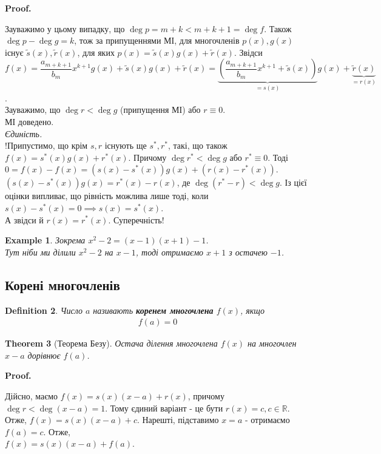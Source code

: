 \documentclass[a4paper, 10pt]{extarticle}
\makeatletter
\def\qed{$\blacksquare$}
\def\qed{$\blacksquare$}
\theoremstyle{theoremdd}
\newtheorem{theorem}{Theorem}[subsection]
\theoremstyle{theoremdd}
\newtheorem{definition}[theorem]{Definition}
\theoremstyle{theoremdd}
\theoremstyle{theoremdd}
\newtheorem{example}[theorem]{Example}
\theoremstyle{theoremdd}
\theoremstyle{theoremdd}
\theoremstyle{theoremdd}
\theoremstyle{theoremdd}
\renewenvironment{proof}[1][Proof.\\]{\par
\pushQED{\hfill \qed}%
\normalfont \topsep6\p@\@plus6\p@\relax
\trivlist
\item\relax
{\bfseries
#1\@addpunct{.}}\hspace\labelsep\ignorespaces
}{%
\popQED\endtrivlist\@endpefalse
}
\makeatother
\begin{document}
\begin{proof}
Зауважимо у цьому випадку, що $\deg p = m+k < m+k+1 = \deg f$. Також $\deg p - \deg g = k$, тож за припущеннями МІ, для многочленів $p(x),g(x)$ існує $\tilde{s}(x), \tilde{r}(x)$, для яких $p(x) = \tilde{s}(x) g(x) + \tilde{r}(x)$. Звідси\\
$f(x) = \dfrac{a_{m+k+1}}{b_m}x^{k+1}g(x) + \tilde{s}(x)g(x) + \tilde{r}(x) = \underbrace{\left(\dfrac{a_{m+k+1}}{b_m}x^{k+1} + \tilde{s}(x) \right)}_{=s(x)}g(x) + \underbrace{\tilde{r}(x)}_{=r(x)}$.\\
Зауважимо, що $\deg r < \deg g$ (припущення МІ) або $r \equiv 0$.\\
МІ доведено.
\bigskip \\
\textit{Єдиність.}\\
!Припустимо, що крім $s,r$ існують ще $s^*,r^*$, такі, що також $f(x) = s^*(x)g(x) + r^*(x)$. Причому $\deg r^* < \deg g$ або $r^* \equiv 0$. Тоді \\ $0 = f(x) - f(x) = (s(x)-s^*(x))g(x) + (r(x)-r^*(x))$.\\
$(s(x)-s^*(x))g(x) = r^*(x)-r(x)$, де $\deg(r^*-r) < \deg g$. Із цієї оцінки випливає, що рівність можлива лише тоді, коли $s(x)-s^*(x) =0 \implies s(x) = s^*(x)$.\\
А звідси й $r(x) = r^*(x)$. Суперечність!
\end{proof}

\begin{example}
Зокрема $x^2-2 = (x-1)(x+1) -1$.\\
Тут ніби ми ділили $x^2-2$ на $x-1$, тоді отримаємо $x+1$ з остачею $-1$.
\end{example}

\subsection{Корені многочленів}
\begin{definition}
Число $a$ називають \textbf{коренем многочлена} $f(x)$, якщо
\begin{align*}
f(a) = 0
\end{align*}
\end{definition}

\begin{theorem}[Теорема Безу]
Остача ділення многочлена $f(x)$ на многочлен $x-a$ дорівнює $f(a)$.
\end{theorem}

\begin{proof}
Дійсно, маємо $f(x) = s(x)(x-a) + r(x)$, причому $\deg r < \deg (x-a) = 1$. Тому єдиний варіант - це бути $r(x) = c, c \in \mathbb{R}$.\\
Отже, $f(x) = s(x)(x-a) + c$. Нарешті, підставимо $x = a$ - отримаємо $f(a) = c$. Отже,\\
$f(x) = s(x)(x-a) + f(a)$.
\end{proof}
\end{document}
